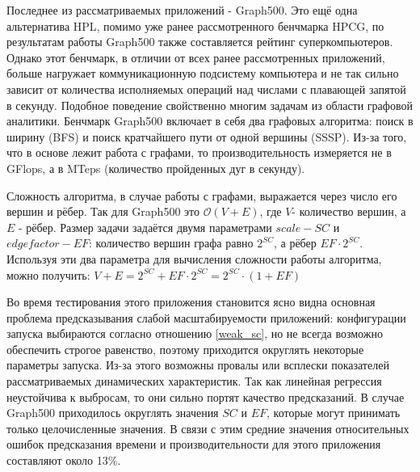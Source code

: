 		Последнее из рассматриваемых приложений - Graph500. Это ещё одна альтернатива HPL, помимо уже ранее рассмотренного бенчмарка HPCG, по результатам работы Graph500 также составляется рейтинг суперкомпьютеров. Однако этот бенчмарк, в отличии от всех ранее рассмотренных приложений, больше нагружает коммуникационную подсистему компьютера и не так сильно зависит от количества исполняемых операций над числами с плавающей запятой в секунду. Подобное поведение свойственно многим задачам из области графовой аналитики. Бенчмарк Graph500 включает в себя два графовых алгоритма: поиск в ширину (BFS) и поиск кратчайшего пути от одной вершины (SSSP). Из-за того, что в основе лежит работа с графами, то производительность измеряется не в GFlops, а в MTeps (количество пройденных дуг в секунду).

		Сложность алгоритма, в случае работы с графами, выражается через число его вершин и рёбер. Так для Graph500 это \(\mathcal{O}(V + E)\), где \(V\)- количество вершин, а \(E\) - рёбер. Размер задачи задаётся двумя параметрами \(scale - SC\) и \(edgefactor - EF\): количество вершин графа равно \(2^{SC}\), а рёбер \(EF \cdot 2^{SC}\). Используя эти два параметра для вычисления сложности работы алгоритма, можно получить: \(V + E = 2^{SC} + EF \cdot 2^{SC} = 2^{SC} \cdot (1 + EF) \)

		Во время тестирования этого приложения становится ясно видна основная проблема предсказывания слабой масштабируемости приложений: конфигурации запуска выбираются согласно отношению \eqref{weak_sc}, но не всегда возможно обеспечить строгое равенство, поэтому приходится округлять некоторые параметры запуска. Из-за этого возможны провалы или всплески показателей рассматриваемых динамических характеристик. Так как линейная регрессия неустойчива к выбросам, то они сильно портят качество предсказаний. В случае Graph500 приходилось округлять значения \(SC\) и \(EF\), которые могут принимать только целочисленные значения. В связи с этим средние значения относительных ошибок предсказания времени и производительности для этого приложения составляют около 13\%.

\clearpage
